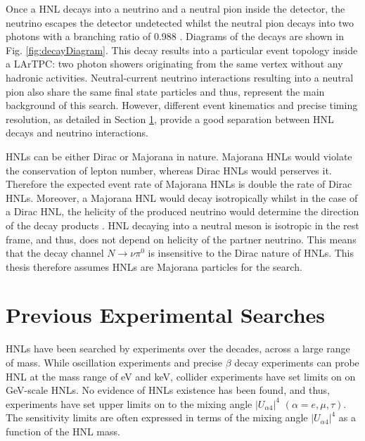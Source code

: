 Once a HNL decays into a neutrino and a neutral pion inside the detector, the neutrino escapes the detector undetected whilst the neutral pion decays into two photons with a branching ratio of 0.988 \cite{pi0}. 
Diagrams of the decays are shown in Fig. \ref{fig:decayDiagram}.
This decay results into a particular event topology inside a LArTPC: two photon showers originating from the same vertex without any hadronic activities.
Neutral-current neutrino interactions resulting into a neutral pion also share the same final state particles and thus, represent the main background of this search.
However, different event kinematics and precise timing resolution, as detailed in Section \ref{}, provide a good separation between HNL decays and neutrino interactions. 

HNLs can be either Dirac or Majorana in nature.
Majorana HNLs would violate the conservation of lepton number, whereas Dirac HNLs would perserves it.
Therefore the expected event rate of Majorana HNLs is double the rate of Dirac HNLs.
Moreover, a Majorana HNL would decay isotropically whilst in the case of a Dirac HNL, the helicity of the produced neutrino would determine the direction of the decay products \cite{HNLSilvia}.
HNL decaying into a neutral meson is isotropic in the rest frame, and thus, does not depend on helicity of the partner neutrino.
This means that the decay channel $N\rightarrow \nu \pi^{0}$ is insensitive to the Dirac nature of HNLs.
This thesis therefore assumes HNLs are Majorana particles for the search.

\section{Previous Experimental Searches}


HNLs have been searched by experiments over the decades, across a large range of mass.
While oscillation experiments and precise $\beta$ decay experiments can probe HNL at the mass range of eV and keV, collider experiments have set limits on on GeV-scale HNLs.
No evidence of HNLs existence has been found, and thus, experiments have set upper limits on to the mixing angle $|U_{\alpha4}|^{4}$ $(\alpha=e,\mu,\tau)$.
The sensitivity limits are often expressed in terms of the mixing angle $|U_{\alpha4}|^{4}$ as a function of the HNL mass.

